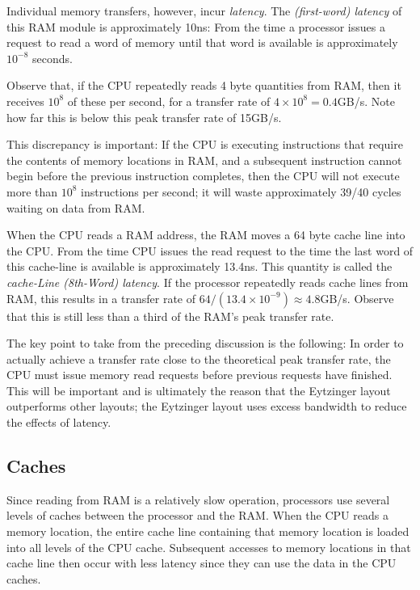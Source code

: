 \documentclass{patmorin}
\begin{document}
Individual memory transfers, however, incur \emph{latency}.  The
\emph{(first-word) latency} of this RAM module is approximately 10ns:
From the time a processor issues a request to read a word of memory
until that word is available is approximately $10^{-8}$ seconds.

Observe that, if the CPU repeatedly reads 4 byte quantities from RAM,
then it receives $10^8$ of these per second, for a transfer rate of
$4\times 10^8=0.4$GB/s.  Note how far this is below this peak transfer
rate of 15GB/s.

This discrepancy is important: If the CPU is executing instructions
that require the contents of memory locations in RAM, and a subsequent
instruction cannot begin before the previous instruction completes,
then the CPU will not execute more than $10^8$ instructions per second;
it will waste approximately 39/40 cycles waiting on data from RAM.

When the CPU reads a RAM address, the RAM moves a 64 byte cache line
into the CPU. From the time CPU issues the read request to the time
the last word of this cache-line is available is approximately 13.4ns.
This quantity is called the \emph{cache-Line (8th-Word) latency}.
If the processor repeatedly reads cache lines from RAM, this results in a
transfer rate of $64 / (13.4\times10^{-9}) \approx 4.8$GB/s.  Observe that
this is still less than a third of the RAM's peak transfer rate.

The key point to take from the preceding discussion is the following: In
order to actually achieve a transfer rate close to the theoretical peak
transfer rate, the CPU must issue memory read requests before previous
requests have finished.  This will be important and is ultimately the
reason that the Eytzinger layout outperforms other layouts; the Eytzinger
layout uses excess bandwidth to reduce the effects of latency.

\subsection{Caches}

Since reading from RAM is a relatively slow operation, processors use
several levels of caches between the processor and the RAM.  When the
CPU reads a memory location, the entire cache line containing that memory
location is loaded into all levels of the CPU cache.  Subsequent accesses
to memory locations in that cache line then occur with less latency
since they can use the data in the CPU caches.
\end{document}
